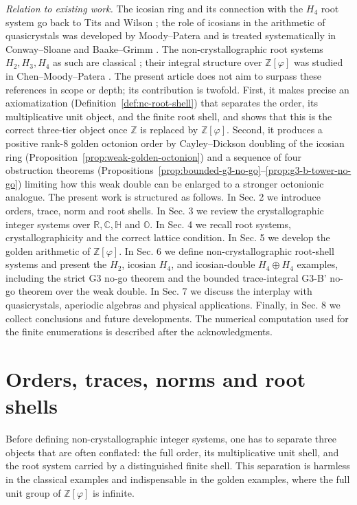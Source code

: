 \documentclass[12pt,oneside,english]{amsart}
\numberwithin{equation}{section}
\numberwithin{figure}{section}
\numberwithin{table}{section}
\theoremstyle{plain}
\theoremstyle{definition}
\theoremstyle{remark}
\newcommand{\ZZ}{\mathbb Z}
\newcommand{\RR}{\mathbb R}
\newcommand{\CC}{\mathbb C}
\newcommand{\HH}{\mathbb H}
\newcommand{\Oct}{\mathbb O}
\newcommand{\Zphi}{\mathbb Z[\varphi]}
\begin{document}
\smallskip
\noindent\emph{Relation to existing work.} The icosian ring and its connection with the \(H_4\) root system go back to Tits \cite{Ti80} and Wilson \cite{Wi86}; the role of icosians in the arithmetic of quasicrystals was developed by Moody--Patera \cite{Icosians} and is treated systematically in Conway--Sloane \cite{Conway} and Baake--Grimm \cite{Aperiodic,Ba98}. The non-crystallographic root systems \(H_2,H_3,H_4\) as such are classical \cite{Humphreys}; their integral structure over \(\Zphi\) was studied in Chen--Moody--Patera \cite{CMP}. The present article does not aim to surpass these references in scope or depth; its contribution is twofold. First, it makes precise an axiomatization (Definition~\ref{def:nc-root-shell}) that separates the order, its multiplicative unit object, and the finite root shell, and shows that this is the correct three-tier object once \(\ZZ\) is replaced by \(\Zphi\). Second, it produces a positive rank-\(8\) golden octonion order by Cayley--Dickson doubling of the icosian ring (Proposition~\ref{prop:weak-golden-octonion}) and a sequence of four obstruction theorems (Propositions~\ref{prop:bounded-g3-no-go}--\ref{prop:g3-b-tower-no-go}) limiting how this weak double can be enlarged to a stronger octonionic analogue. 
The present work is structured as follows. In Sec. 2 we introduce orders, trace, norm and root shells. In Sec. 3 we review the crystallographic integer systems over \(\RR,\CC,\HH\) and \(\Oct\). In Sec. 4 we recall root systems, crystallographicity and the correct lattice condition. In Sec. 5 we develop the golden arithmetic of \(\Zphi\). In Sec. 6 we define non-crystallographic root-shell systems and present the \(H_2\), icosian \(H_4\), and icosian-double \(H_4\oplus H_4\) examples, including the strict G3 no-go theorem and the bounded trace-integral G3-B' no-go theorem over the weak double. In Sec. 7 we discuss the interplay with quasicrystals, aperiodic algebras and physical applications. Finally, in Sec. 8 we collect conclusions and future developments. The numerical computation used for the finite enumerations is described after the acknowledgments.

\section{Orders, traces, norms and root shells}

Before defining non-crystallographic integer systems, one has to separate three objects that are often conflated: the full order, its multiplicative unit shell, and the root system carried by a distinguished finite shell. This separation is harmless in the classical examples and indispensable in the golden examples, where the full unit group of \(\Zphi\) is infinite.
\end{document}
